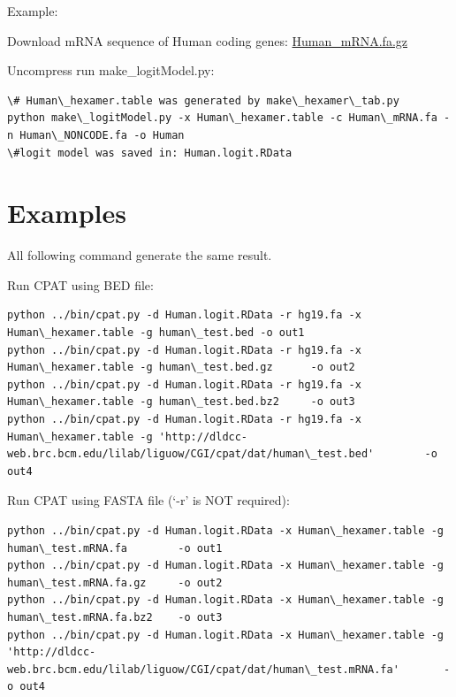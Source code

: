 \documentclass[letterpaper,10pt,english]{sphinxmanual}
\begin{document}
Example:

Download mRNA sequence of Human coding genes: \href{http://sourceforge.net/projects/rna-cpat/files/Human\_mRNA.fa.gz/download}{Human\_mRNA.fa.gz}

Uncompress run make\_logitModel.py:

\begin{Verbatim}[commandchars=\\\{\}]
\# Human\_hexamer.table was generated by make\_hexamer\_tab.py
python make\_logitModel.py -x Human\_hexamer.table -c Human\_mRNA.fa -n Human\_NONCODE.fa -o Human
\#logit model was saved in: Human.logit.RData
\end{Verbatim}


\section{Examples}
\label{index:examples}
All following command generate the same result.

Run CPAT using BED file:

\begin{Verbatim}[commandchars=\\\{\}]
python ../bin/cpat.py -d Human.logit.RData -r hg19.fa -x Human\_hexamer.table -g human\_test.bed -o out1
python ../bin/cpat.py -d Human.logit.RData -r hg19.fa -x Human\_hexamer.table -g human\_test.bed.gz      -o out2
python ../bin/cpat.py -d Human.logit.RData -r hg19.fa -x Human\_hexamer.table -g human\_test.bed.bz2     -o out3
python ../bin/cpat.py -d Human.logit.RData -r hg19.fa -x Human\_hexamer.table -g 'http://dldcc-web.brc.bcm.edu/lilab/liguow/CGI/cpat/dat/human\_test.bed'        -o out4
\end{Verbatim}

Run CPAT using FASTA file (`-r' is NOT required):

\begin{Verbatim}[commandchars=\\\{\}]
python ../bin/cpat.py -d Human.logit.RData -x Human\_hexamer.table -g human\_test.mRNA.fa        -o out1
python ../bin/cpat.py -d Human.logit.RData -x Human\_hexamer.table -g human\_test.mRNA.fa.gz     -o out2
python ../bin/cpat.py -d Human.logit.RData -x Human\_hexamer.table -g human\_test.mRNA.fa.bz2    -o out3
python ../bin/cpat.py -d Human.logit.RData -x Human\_hexamer.table -g 'http://dldcc-web.brc.bcm.edu/lilab/liguow/CGI/cpat/dat/human\_test.mRNA.fa'       -o out4
\end{Verbatim}
\end{document}
